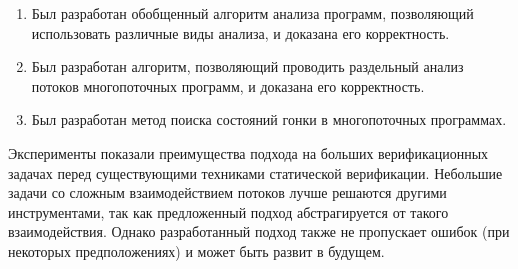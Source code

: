

\begin{enumerate}
  \item Был разработан обобщенный алгоритм анализа программ, позволяющий использовать различные виды анализа, и доказана его корректность.
  \item Был разработан алгоритм, позволяющий проводить раздельный анализ потоков многопоточных программ, и доказана его корректность.
  \item Был разработан метод поиска состояний гонки в многопоточных программах.
\end{enumerate}

Эксперименты показали преимущества подхода на больших верификационных задачах перед существующими техниками статической верификации.
Небольшие задачи со сложным взаимодействием потоков лучше решаются другими инструментами, так как предложенный подход абстрагируется от такого взаимодействия.
Однако разработанный подход также не пропускает ошибок (при некоторых предположениях) и может быть развит в будущем.


